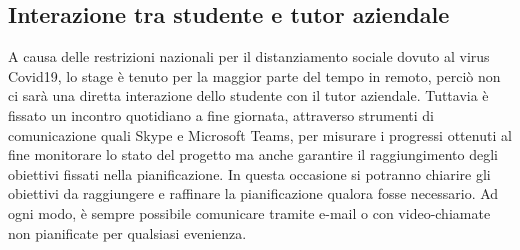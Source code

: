 \subsection{Interazione tra studente e tutor aziendale}

A causa delle restrizioni nazionali per il distanziamento sociale dovuto al virus Covid19, lo stage è tenuto per la maggior parte del tempo in remoto, perciò non ci sarà una diretta interazione dello studente con il tutor aziendale. Tuttavia è fissato un incontro quotidiano a fine giornata, attraverso strumenti di comunicazione quali Skype e Microsoft Teams, per misurare i progressi ottenuti al fine monitorare lo stato del progetto ma anche garantire il raggiungimento degli obiettivi fissati nella pianificazione. In questa occasione si potranno chiarire gli obiettivi da raggiungere e raffinare la pianificazione qualora fosse necessario.
Ad ogni modo, è sempre possibile comunicare tramite e-mail o con video-chiamate non pianificate per qualsiasi evenienza.